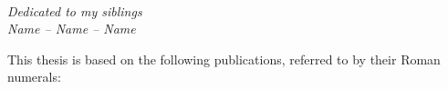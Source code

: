 \documentclass[11pt]{book}
\begin{document}


\newpage
\thispagestyle{empty} %
~
\vspace{140pt}
\begin{flushright}
\textit{Dedicated to my siblings\\Name -- Name -- Name}
\end{flushright}


\cleardoublepage

\setcounter{page}{1} %
\setcounter{tocdepth}{1}
\tableofcontents


\newpage
{}
This thesis is based on the following publications, referred to by their Roman numerals:
\vspace{2mm}
\end{document}
